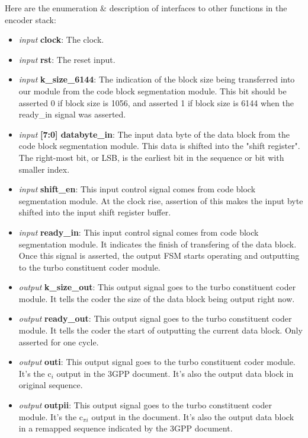 \documentclass[letterpaper, 12pt]{article} %
\begin{document}
Here are the enumeration \& description of interfaces to other functions in the encoder stack:\\

\begin{itemize}
    \item {\it input} {\bf clock}: The clock.
    \item {\it input} {\bf rst}: The reset input.
    \item {\it input} {\bf k\_size\_6144}: The indication of the block size being transferred into our module from the code block segmentation module. This bit should be asserted 0 if block size is 1056, and asserted 1 if block size is 6144 when the ready\_in signal was asserted.
    \item {\it input} {\bf [7:0] databyte\_in}: The input data byte of the data block from the code block segmentation module. This data is shifted into the "shift register". The right-most bit, or LSB, is the earliest bit in the sequence or bit with smaller index.
    \item {\it input} {\bf shift\_en}: This input control signal comes from code block segmentation module. At the clock rise, assertion of this makes the input byte shifted into the input shift register buffer.
    \item {\it input} {\bf ready\_in}: This input control signal comes from code block segmentation module. It indicates the finish of transfering of the data block. Once this signal is asserted, the output FSM starts operating and outputting to the turbo constituent coder module.
    \item {\it output} {\bf k\_size\_out}: This output signal goes to the turbo constituent coder module. It tells the coder the size of the data block being output right now.
    \item {\it output} {\bf ready\_out}: This output signal goes to the turbo constituent coder module. It tells the coder the start of outputting the current data block. Only asserted for one cycle. 
    \item {\it output} {\bf outi}: This output signal goes to the turbo constituent coder module. It's the c$_i$ output in the 3GPP document. It's also the output data block in original sequence.
    \item {\it output} {\bf outpii}: This output signal goes to the turbo constituent coder module. It's the c$_{\pi i}$ output in the document. It's also the output data block in a remapped sequence indicated by the 3GPP document.
\end{itemize}
\end{document}
